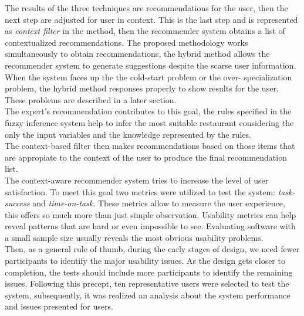The results of the three techniques are recommendations for the user,
then the next step are adjusted  for user in context. This is the last
step and is represented as \textit{context filter} in the method, then
the recommender system obtains a list of contextualized
recommendations. The proposed methodology works simultaneously to
obtain recommendations, the hybrid method allows the recommender
system to generate suggestions despite the scarse user information.
When the system faces up the the cold-start problem or the over-
specialization problem, the hybrid method responses properly to show
results for the user. These problems are described in a later
section. \\
The expert's recommendation contributes to this goal, the rules
specified in the fuzzy inference system help to infer the most
suitable restaurant considering the only the input variables and the
knowledge represented by the rules.\\ The context-based filter then
makes recommendations based on those items that are appropiate to the
context of the user to produce the final recommendation list. \\
The context-aware recommender system tries to increase the 
level of user satisfaction.
To meet this goal two metrics were utilized to test the system:
\textit{task-success} and \textit{time-on-task}. These metrics allow
to measure the user experience, this offers so much more than just
simple observation. Usability metrics can help reveal patterns that
are hard or even impossible to see. Evaluating software with a small
sample size usually reveals the most obvious usability
problems\cite{albert2013measuring}.\\
Then, as a general rule of thumb, during the early stages of design,
we need fewer participants to identify the major usability issues. As
the design gets closer to completion, the tests should include more
participants to identify the remaining issues. Following this precept,
ten representative users were selected to test the system,
subsequently, it was realized an analysis about the system performance
and issues presented for users.\\
%
%
